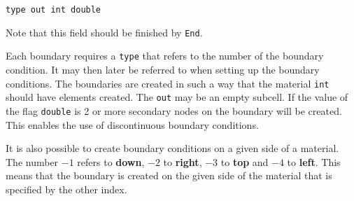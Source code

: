 \texttt{type out int double}

Note that this field should be finished by 
\texttt{End}. 

Each boundary requires a \texttt{type} that refers 
to the number of the boundary condition.
It may then later be referred to when setting 
up the boundary conditions.
The boundaries are created in such a way that
the material \texttt{int} should have elements
created. The \texttt{out} may be an empty subcell.
If the value of the flag \texttt{double} is 2 or more 
secondary nodes on the
boundary will be created. This enables the use of
discontinuous boundary conditions.

It is also possible to create boundary conditions on a 
given side of a material. The number $-1$ refers to \textbf{down},
$-2$ to \textbf{right}, $-3$ to \textbf{top} and $-4$ to \textbf{left}. 
This means that the boundary is created on the given side 
of the material that is specified by the other index.

